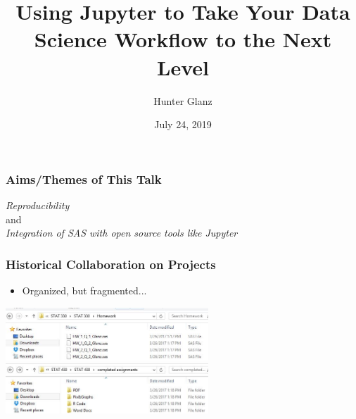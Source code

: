 \documentclass[xcolor={dvipsnames}]{beamer}
\title[]{Using Jupyter to Take Your Data Science Workflow to the Next Level}
\author[Glanz]{Hunter Glanz}
\institute[]{California Polytechnic State University \\ San Luis Obispo, California, USA}
\date{July 24, 2019}
\newcommand{\ft}{\frametitle}
\newcommand{\bi}{\begin{itemize}}
\newcommand{\ei}{\end{itemize}}
\begin{document}
\frame{\titlepage}


\begin{frame}
\ft{Aims/Themes of This Talk}
\begin{center}
	\emph{Reproducibility} \\
	\pause
	and \\
	\emph{Integration of SAS with open source tools like Jupyter}
\end{center}
\end{frame}

\begin{frame}
\frametitle{Historical Collaboration on Projects}
\bi
	\item Organized, but fragmented...
\ei
\pause
\begin{center}
	\includegraphics[width = 3in]{STAT330Files.JPG} \\ \vspace{.5in}
	\includegraphics[width = 3in]{STAT331Files.JPG}
\end{center}
\end{frame}
\end{document}
